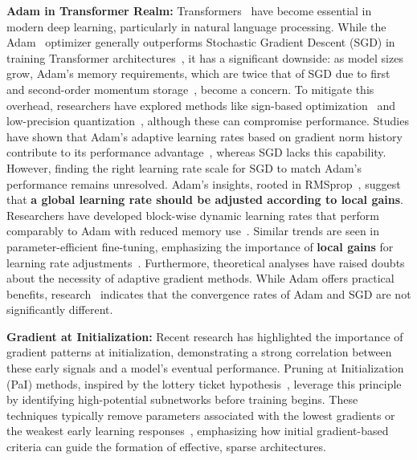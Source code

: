 \textbf{Adam in Transformer Realm:} Transformers~\cite{vaswani2017attention} have become essential in modern deep learning, particularly in natural language processing. While the Adam~\cite{kingma2014adam} optimizer generally outperforms Stochastic Gradient Descent (SGD) in training Transformer architectures~\cite{xiao2021earlyconvolutionshelptransformers}, it has a significant downside: as model sizes grow, Adam's memory requirements, which are twice that of SGD due to first and second-order momentum storage~\cite{kingma2014adam}, become a concern.
To mitigate this overhead, researchers have explored methods like sign-based optimization~\cite{bernstein2018signsgdcompressedoptimisationnonconvex, kunstner2023noise} and low-precision quantization~\cite{li2023memoryefficientoptimizers4bit, DBLP:journals/corr/abs-2110-02861, dettmers2022llm, dettmers2023case}, although these can compromise performance. Studies have shown that Adam’s adaptive learning rates based on gradient norm history contribute to its performance advantage~\cite{zhang2024transformers}, whereas SGD lacks this capability. However, finding the right learning rate scale for SGD to match Adam’s performance remains unresolved.
Adam's insights, rooted in RMSprop~\cite{hinton2012neural}, suggest that \textbf{a global learning rate should be adjusted according to local gains}. Researchers have developed block-wise dynamic learning rates that perform comparably to Adam with reduced memory use~\cite{zhang2024adamminiusefewerlearning}. Similar trends are seen in parameter-efficient fine-tuning, emphasizing the importance of \textbf{local gains} for learning rate adjustments~\cite{zhang2024riemannian}.
Furthermore, theoretical analyses have raised doubts about the necessity of adaptive gradient methods. While Adam offers practical benefits, research~\cite{liconvergence23} indicates that the convergence rates of Adam and SGD are not significantly different.


\textbf{Gradient at Initialization:} 
Recent research has highlighted the importance of gradient patterns at initialization, demonstrating a strong correlation between these early signals and a model’s eventual performance. Pruning at Initialization (PaI) methods, inspired by the lottery ticket hypothesis~\cite{frankle2018lottery}, leverage this principle by identifying high-potential subnetworks before training begins. These techniques typically remove parameters associated with the lowest gradients or the weakest early learning responses~\cite{tanaka2020pruning, frankle2020pruning, lee2018snip}, emphasizing how initial gradient-based criteria can guide the formation of effective, sparse architectures.

